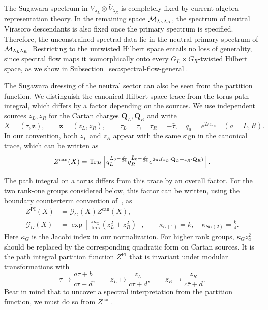 \documentclass[11pt]{article}
\numberwithin{equation}{section}
\begin{document}
The Sugawara spectrum in $V_{\lambda_L}\otimes\bar V_{\lambda_R}$ is completely fixed by current-algebra representation theory. In the remaining space $\mathcal{M}_{\lambda_L\lambda_R}$, the spectrum of neutral Virasoro descendants is also fixed once the primary spectrum is specified. Therefore, the unconstrained spectral data lie in the neutral-primary spectrum of $\mathcal{M}_{\lambda_L\lambda_R}$.
Restricting to the untwisted Hilbert space entails no loss of generality, since spectral flow maps it isomorphically onto every $G_L\times G_R$-twisted Hilbert space, as we show in Subsection~\ref{sec:spectral-flow-general}.

The Sugawara dressing of the neutral sector can also be seen from the partition function. We distinguish the canonical Hilbert space trace from the torus path integral, which differs by a factor depending on the sources. We use independent sources $z_L,z_R$ for the Cartan charges $\mathbf Q_L,\mathbf Q_R$ and write
\begin{equation}
    X=(\tau,\mathbf z),\qquad \mathbf z=(z_L,z_R),\qquad
    \tau_L=\tau,\quad \tau_R=-\bar\tau,\quad
    q_a=e^{2\pi i\tau_a}\quad(a=L,R).
\end{equation}
In our convention, both $z_L$ and $z_R$ appear with the same sign in the canonical trace, which can be written as
\begin{equation}
Z^{\mathrm{can}}(X)
    =\operatorname{Tr}_{\mathcal H}\left[
      q_L^{L_0-\frac c{24}}q_R^{\bar L_0-\frac c{24}}
      e^{2\pi i(z_L\cdot\mathbf Q_L+z_R\cdot\mathbf Q_R)}\right].
\label{eq:CFT-canonical-trace}
\end{equation}

The path integral on a torus differs from this trace by an overall factor. For the two rank-one groups considered below, this factor can be written, using the boundary counterterm convention of~\cite{Kraus:2006wn}, as
\begin{equation}
\begin{aligned}
    Z^{\mathrm{PI}}(X)&=\mathcal G_G(X)Z^{\mathrm{can}}(X),\\
    \mathcal G_G(X)&=\exp\!\left[\frac{\pi\kappa_G}{\operatorname{Im}\tau}
                    (z_L^2+z_R^2)\right],\qquad
    \kappa_{U(1)}=k,\quad \kappa_{SU(2)}=\frac{k}{4}.
\end{aligned}
\label{eq:CFT-PI-canonical}
\end{equation}
Here $\kappa_G$ is the Jacobi index in our normalization. For higher rank groups, $\kappa_G z_a^2$ should be replaced by the corresponding quadratic form on Cartan sources. It is the path integral partition function $Z^{\mathrm{PI}}$ that is invariant under modular transformations with
\begin{equation}
    \tau\longmapsto\frac{a\tau+b}{c\tau+d},\qquad
    z_L\longmapsto\frac{z_L}{c\tau+d},\qquad
    z_R\longmapsto\frac{z_R}{c\bar\tau+d}.
\end{equation}
Bear in mind that to uncover a spectral interpretation from the partition function, we must do so from $Z^{\mathrm{can}}$.
\end{document}
